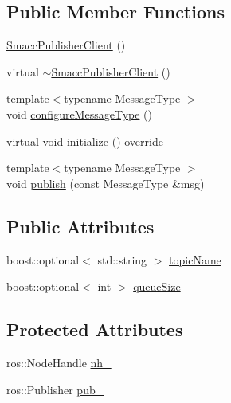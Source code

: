 \subsection*{Public Member Functions}
\begin{DoxyCompactItemize}
\item 
\hyperlink{classsmacc_1_1SmaccPublisherClient_ab68718f6c1846da5069069b6861ade20}{Smacc\+Publisher\+Client} ()
\item 
virtual \hyperlink{classsmacc_1_1SmaccPublisherClient_a081eda5646215dd87b66ff4e086c97c5}{$\sim$\+Smacc\+Publisher\+Client} ()
\item 
{\footnotesize template$<$typename Message\+Type $>$ }\\void \hyperlink{classsmacc_1_1SmaccPublisherClient_a29e70233aebc34245ab5927534ca6291}{configure\+Message\+Type} ()
\item 
virtual void \hyperlink{classsmacc_1_1SmaccPublisherClient_a90710541fbc7c32600d29a065137cc50}{initialize} () override
\item 
{\footnotesize template$<$typename Message\+Type $>$ }\\void \hyperlink{classsmacc_1_1SmaccPublisherClient_ab82b8234c5bbedf393b70cff442bd5be}{publish} (const Message\+Type \&msg)
\end{DoxyCompactItemize}
\subsection*{Public Attributes}
\begin{DoxyCompactItemize}
\item 
boost\+::optional$<$ std\+::string $>$ \hyperlink{classsmacc_1_1SmaccPublisherClient_a4b8401543c3d532e81453c9106ddaefc}{topic\+Name}
\item 
boost\+::optional$<$ int $>$ \hyperlink{classsmacc_1_1SmaccPublisherClient_ad7a0aa074031d2c2ea332a4d517dbae5}{queue\+Size}
\end{DoxyCompactItemize}
\subsection*{Protected Attributes}
\begin{DoxyCompactItemize}
\item 
ros\+::\+Node\+Handle \hyperlink{classsmacc_1_1SmaccPublisherClient_aaebda6a40634daf81c80add02f938ad3}{nh\+\_\+}
\item 
ros\+::\+Publisher \hyperlink{classsmacc_1_1SmaccPublisherClient_a674fc5715c4983d093c8ae387232ae55}{pub\+\_\+}
\end{DoxyCompactItemize}
